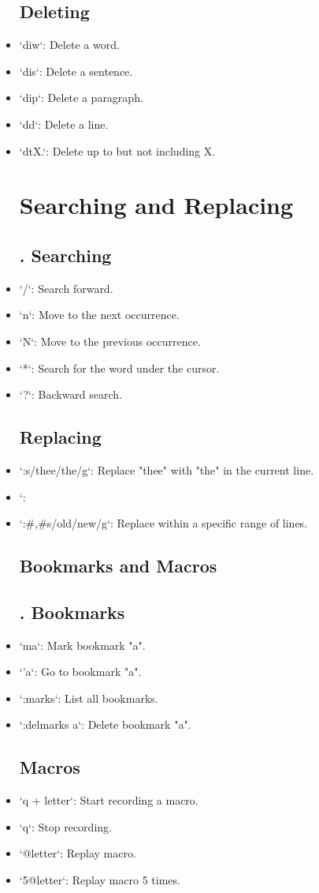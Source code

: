 \documentclass{report}
\begin{document}
\begin{itemize}
	\subsection{Deleting}
\item `diw`: Delete a word.
\item `dis`: Delete a sentence.
\item `dip`: Delete a paragraph.
\item `dd`: Delete a line.
\item `dtX.`: Delete up to but not including X.
	\section{Searching and Replacing}
	\subsection{. Searching}
\item `/`: Search forward.
\item `n`: Move to the next occurrence.
\item `N`: Move to the previous occurrence.
\item `*`: Search for the word under the cursor.
\item `?`: Backward search.
	\subsection{Replacing}
\item `:s/thee/the/g`: Replace "thee" with "the" in the current line.
\item `:%
\item `:\#,\#s/old/new/g`: Replace within a specific range of lines.
	\subsection{ Bookmarks and Macros}
	\subsection{. Bookmarks}
\item `ma`: Mark bookmark "a".
\item `'a`: Go to bookmark "a".
\item `:marks`: List all bookmarks.
\item `:delmarks a`: Delete bookmark "a".
	\subsection{Macros}
\item `q + {letter}`: Start recording a macro.
\item `q`: Stop recording.
\item `@{letter}`: Replay macro.
\item `5@{letter}`: Replay macro 5 times.

\end{itemize}
\end{document}
